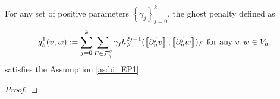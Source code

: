 \begin{proposition}
    For any set of positive parameters $\left\{ \gamma _{j} \right\} _{j=0}^{k}$, the ghost penalty defined as \[
    g^{1}_{h}( v,w)  := \sum_{j=0}^{k} \sum_{F \in \mathcal{F} _{h}^{g}}^{} \gamma _{j} h^{2j-1}_{F} ( \jump{ \partial ^{j}_{n} v }, \jump{ \partial ^{j}_{n} w }  ) _{F} \text{ for any } v,w \in V_{h},
    \]
    satisfies the Assumption \ref{as:bi_EP1}
\end{proposition}

\begin{proof}
\end{proof}



